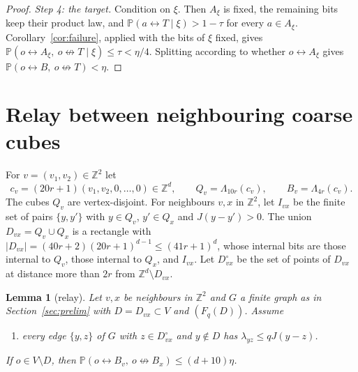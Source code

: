 \documentclass[11pt]{article}
\newtheorem{lemma}[theorem]{Lemma}
\theoremstyle{definition}
\theoremstyle{remark}
\numberwithin{equation}{section}
\newcommand{\Z}{\mathbb Z}
\newcommand{\Pp}{\mathbb P}
\newcommand{\1}{\mathbf 1}
\newcommand{\lr}{\leftrightarrow}
\newcommand{\nlr}{\mathrel{\not\leftrightarrow}}
\newcommand{\Lam}{\Lambda}
\begin{document}
\begin{proof}
\emph{Step 4: the target.} Condition on $\xi$. Then $A_\xi$ is fixed, the remaining bits keep their
product law, and $\Pp(a\lr T\mid\xi)>1-\tau$ for every $a\in A_\xi$. Corollary~\ref{cor:failure},
applied with the bits of $\xi$ fixed, gives $\Pp(o\lr A_\xi,\ o\nlr T\mid\xi)\le\tau<\eta/4$.
Splitting according to whether $o\lr A_\xi$ gives $\Pp(o\lr B,\ o\nlr T)<\eta$.
\end{proof}

\section{Relay between neighbouring coarse cubes}\label{sec:relay}

For $v=(v_1,v_2)\in\Z^2$ let
\[
c_v=(20r+1)(v_1,v_2,0,\dots,0)\in\Z^d,\qquad Q_v=\Lam_{10r}(c_v),\qquad B_v=\Lam_{4r}(c_v).
\]
The cubes $Q_v$ are vertex-disjoint. For neighbours $v,x$ in $\Z^2$, let $I_{vx}$ be the finite set
of pairs $\{y,y'\}$ with $y\in Q_v$, $y'\in Q_x$ and $J(y-y')>0$. The union $D_{vx}=Q_v\cup Q_x$ is a
rectangle with $|D_{vx}|=(40r+2)(20r+1)^{d-1}\le(41r+1)^d$, whose internal bits are those internal to
$Q_v$, those internal to $Q_x$, and $I_{vx}$. Let $D^\circ_{vx}$ be the set of points of $D_{vx}$ at
distance more than $2r$ from $\Z^d\setminus D_{vx}$.

\begin{lemma}[relay]\label{lem:relay}
Let $v,x$ be neighbours in $\Z^2$ and $G$ a finite graph as in Section~\ref{sec:prelim} with
$D=D_{vx}\subset V$ and $(F_q(D))$. Assume
\begin{enumerate}
\item[(E2$^\circ$)] every edge $\{y,z\}$ of $G$ with $z\in D^\circ_{vx}$ and $y\notin D$ has
$\lambda_{yz}\le qJ(y-z)$.
\end{enumerate}
If $o\in V\setminus D$, then $\Pp(o\lr B_v,\ o\nlr B_x)\le(d+10)\eta$.
\end{lemma}
\end{document}
